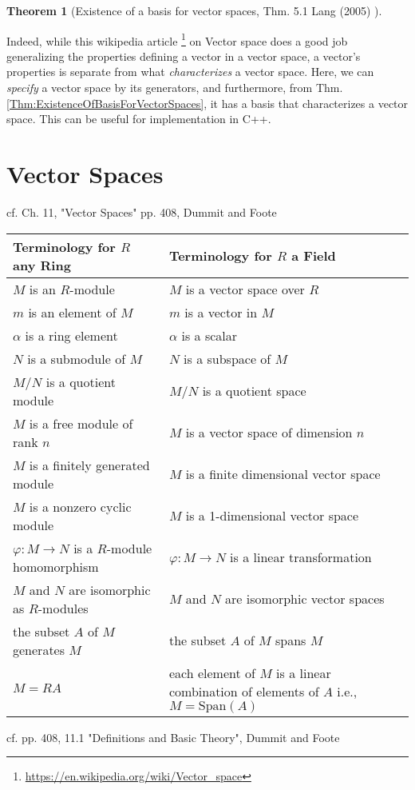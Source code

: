 \documentclass[10pt]{amsart}
\newtheorem{theorem}{Theorem}
\begin{document}
\begin{multicols*}{2}
\begin{theorem}[Existence of a basis for vector spaces, Thm. 5.1 Lang (2005) \cite{Lang2005}]
\end{theorem}
	
Indeed, while this wikipedia article \footnote{\url{https://en.wikipedia.org/wiki/Vector_space}} on Vector space does a good job generalizing the properties defining a vector in a vector space, a vector's properties is separate from what \emph{characterizes} a vector space. Here, we can \emph{specify} a vector space by its generators, and furthermore, from Thm. \ref{Thm:ExistenceOfBasisForVectorSpaces}, it has a basis that characterizes a vector space. This can be useful for implementation in C++.

\section{Vector Spaces}

cf. Ch. 11, "Vector Spaces" pp. 408, Dummit and Foote \cite{DuFo2003}

\begin{center}
\begin{tabular}{l | l }
\textbf{Terminology for $R$ any Ring} & \textbf{Terminology for $R$ a Field } \\
\hline
$M$ is an $R$-module & $M$ is a vector space over $R$ \\
$m$ is an element of $M$ & $m$ is a vector in $M$ \\
$\alpha$ is a ring element & $\alpha$ is a scalar \\
$N$ is a submodule of $M$ & $N$ is a subspace of $M$ \\
$M/N$ is a quotient module & $M/N$ is a quotient space \\
$M$ is a free module of rank $n$ & $M$ is a vector space of dimension $n$ \\
$M$ is a finitely generated module & $M$ is a finite dimensional vector space \\
$M$ is a nonzero cyclic module & $M$ is a 1-dimensional vector space \\
$\varphi : M \to N$ is a $R$-module homomorphism & $\varphi : M \to N$ is a linear transformation \\
$M$ and $N$ are isomorphic as $R$-modules & $M$ and $N$ are isomorphic vector spaces \\
the subset $A$ of $M$ generates $M$ & the subset $A$ of $M$ spans $M$ \\
$M = RA$ & each element of $M$ is a linear combination of elements of $A$ i.e., $M=\text{Span}(A)$
\end{tabular} 
\end{center}
cf. pp. 408, 11.1 "Definitions and Basic Theory", Dummit and Foote \cite{DuFo2003}


\end{multicols*}
\end{document}
